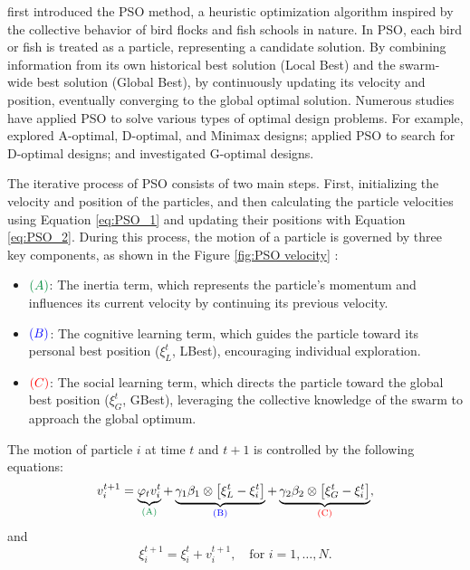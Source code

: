 \hspace*{8mm} \cite{eberhart1995new} first introduced the PSO method, a heuristic optimization algorithm inspired by the collective behavior of bird flocks and fish schools in nature. In PSO, each bird or fish is treated as a particle, representing a candidate solution. By combining information from its own historical best solution (Local Best) and the swarm-wide best solution (Global Best), by continuously updating its velocity and position, eventually converging to the global optimal solution. Numerous studies have applied PSO to solve various types of optimal design problems. For example, \cite{chen2011optimal} explored A-optimal, D-optimal, and Minimax designs; \cite{lukemire2016using} applied PSO to search for D-optimal designs; and \cite{walsh2022fast} investigated G-optimal designs.

\hspace*{8mm} The iterative process of PSO consists of two main steps. First, initializing the velocity and position of the particles, and then calculating the particle velocities using Equation \eqref{eq:PSO_1} and updating their positions with Equation \eqref{eq:PSO_2}. During this process, the motion of a particle is governed by three key components, as shown in the Figure \ref{fig:PSO velocity} :

\begin{itemize}
\item $\textcolor{PowerPointGreen}{(A)}$: The inertia term, which represents the particle's momentum and influences its current velocity by continuing its previous velocity.

\item $\textcolor{blue}{(B)}$: The cognitive learning term, which guides the particle toward its personal best position ($\xi_L^{t}$, LBest), encouraging individual exploration.

\item $\textcolor{red}{(C)}$: The social learning term, which directs the particle toward the global best position ($\xi_G^{t}$, GBest), leveraging the collective knowledge of the swarm to approach the global optimum.

\end{itemize}

The motion of particle $i$ at time $t$ and $t+1$ is controlled by the following equations:
\begin{equation}\label{eq:PSO_1}
v_i^{t+1} = \underbrace{\varphi_{t} v_i^{t}}_{\textcolor{PowerPointGreen}{\text{(A)}}} + \underbrace{\gamma_1 \beta_1 \otimes \left[ \xi_{L}^{t} - \xi_i^{t} \right]}_{\textcolor{blue}{\text{(B)}}} + \underbrace{\gamma_2 \beta_2 \otimes \left[ \xi_G^{t} - \xi_i^{t} \right]}_{\textcolor{red}{\text{(C)}}},
\end{equation}
and
\begin{equation}\label{eq:PSO_2}
\xi_i^{t+1} = \xi_i^{t} + v_i^{t+1}, \quad \text{for } i = 1, \dots, N.
\end{equation}

